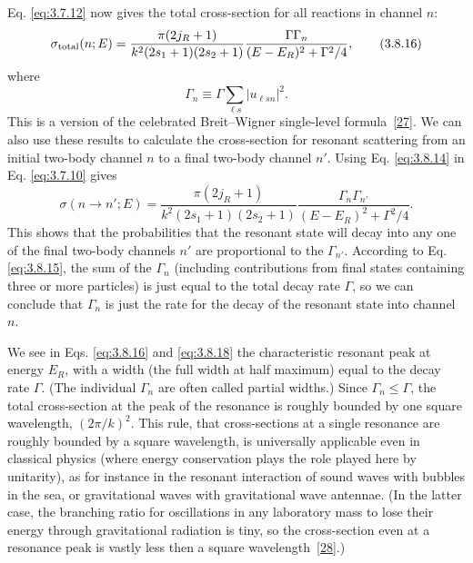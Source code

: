 Eq. \eqref{eq:3.7.12} now gives the total cross-section for all reactions in channel
$n$:
\begin{equation}
  \sigma_{\rm total}(n;E)
  =\frac{\pi(2j_R+1)}{k^2(2s_1+1)(2s_2+1)}
   \frac{\Gamma\Gamma_n}{(E-E_R)^2+\Gamma^2/4},
  \tag{3.8.16}\label{eq:3.8.16}
\end{equation}
where
\begin{equation}
  \Gamma_n\equiv\Gamma\sum_{\ell s}|u_{\ell sn}|^2.
  \tag{3.8.17}\label{eq:3.8.17}
\end{equation}
This is a version of the celebrated Breit--Wigner single-level formula~\hyperref[ref:3.27]{[27]}.
We can also use these results to calculate the cross-section for resonant
scattering from an initial two-body channel $n$ to a final two-body channel
$n'$. Using Eq. \eqref{eq:3.8.14} in Eq. \eqref{eq:3.7.10} gives
\begin{equation}
  \sigma(n\to n';E)
  =\frac{\pi(2j_R+1)}{k^2(2s_1+1)(2s_2+1)}
   \frac{\Gamma_n\Gamma_{n'}}{(E-E_R)^2+\Gamma^2/4}.
  \tag{3.8.18}\label{eq:3.8.18}
\end{equation}
This shows that the probabilities that the resonant state will decay into any
one of the final two-body channels $n'$ are proportional to the
$\Gamma_{n'}$. According to Eq. \eqref{eq:3.8.15}, the sum of the $\Gamma_n$
(including contributions from final states containing three or more
particles) is just equal to the total decay rate $\Gamma$, so we can conclude
that $\Gamma_n$ is just the rate for the decay of the resonant state into
channel $n$.

We see in Eqs. \eqref{eq:3.8.16} and \eqref{eq:3.8.18} the characteristic resonant peak at
energy $E_R$, with a width (the full width at half maximum) equal to the decay
rate $\Gamma$. (The individual $\Gamma_n$ are often called partial widths.)
Since $\Gamma_n\leq\Gamma$, the total cross-section at the peak of the
resonance is roughly bounded by one square wavelength, $(2\pi/k)^2$. This
rule, that cross-sections at a single resonance are roughly bounded by a
square wavelength, is universally applicable even in classical physics
(where energy conservation plays the role played here by unitarity), as for
instance in the resonant interaction of sound waves with bubbles in the sea,
or gravitational waves with gravitational wave antennae. (In the latter
case, the branching ratio for oscillations in any laboratory mass to lose
their energy through gravitational radiation is tiny, so the cross-section
even at a resonance peak is vastly less then a square wavelength~\hyperref[ref:3.28]{[28]}.)

